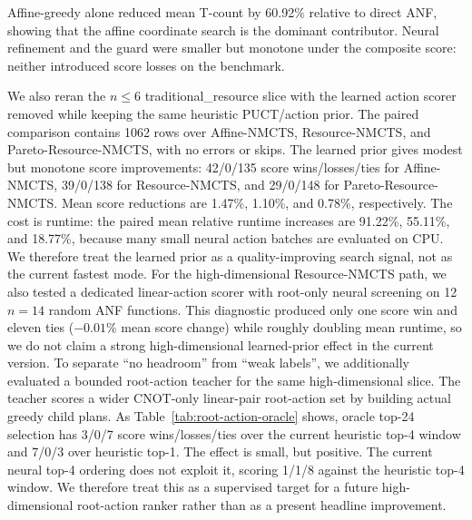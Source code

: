 \documentclass[11pt]{article}
\newcommand{\method}{Resource-NMCTS}
\newcommand{\affinemethod}{Affine-NMCTS}
\newcommand{\paretomethod}{Pareto-Resource-NMCTS}
\newcommand{\traditionaldataset}{traditional\_resource}
\begin{document}
Affine-greedy alone reduced mean T-count by 60.92\% relative to direct ANF,
showing that the affine coordinate search is the dominant contributor.  Neural
refinement and the guard were smaller but monotone under the composite score:
neither introduced score losses on the benchmark.

We also reran the $n\leq 6$ \traditionaldataset{} slice with the learned action
scorer removed while keeping the same heuristic PUCT/action prior.  The paired
comparison contains 1062 rows over \affinemethod{}, \method{}, and
\paretomethod{}, with no errors or skips.  The learned prior gives modest but
monotone score improvements: 42/0/135 score wins/losses/ties for
\affinemethod{}, 39/0/138 for \method{}, and 29/0/148 for \paretomethod{}.
Mean score reductions are 1.47\%, 1.10\%, and 0.78\%, respectively.  The cost
is runtime: the paired mean relative runtime increases are 91.22\%, 55.11\%,
and 18.77\%, because many small neural action batches are evaluated on CPU.
We therefore treat the learned prior as a quality-improving search signal, not
as the current fastest mode.
For the high-dimensional Resource-NMCTS path, we also tested a dedicated
linear-action scorer with root-only neural screening on 12 $n=14$ random ANF
functions.  This diagnostic produced only one score win and eleven ties
($-0.01\%$ mean score change) while roughly doubling mean runtime, so we do not
claim a strong high-dimensional learned-prior effect in the current version.
To separate ``no headroom'' from ``weak labels'', we additionally evaluated a
bounded root-action teacher for the same high-dimensional slice.  The teacher
scores a wider CNOT-only linear-pair root-action set by building actual greedy
child plans.  As Table~\ref{tab:root-action-oracle} shows, oracle top-24
selection has 3/0/7 score wins/losses/ties over the current heuristic top-4
window and 7/0/3 over heuristic top-1.  The effect is small, but positive.  The
current neural top-4 ordering does not exploit it, scoring 1/1/8 against the
heuristic top-4 window.  We therefore treat this as a supervised target for a
future high-dimensional root-action ranker rather than as a present headline
improvement.

\begin{table}[t]
\centering
\small
\caption{Learned-prior ablation on the $n\leq 6$ \traditionaldataset{} slice.
Rows compare the learned action scorer against the same search with only the
heuristic action prior.  Negative mean score change favors the learned prior.}
\label{tab:neural-prior-ablation}

\end{table}
\end{document}
